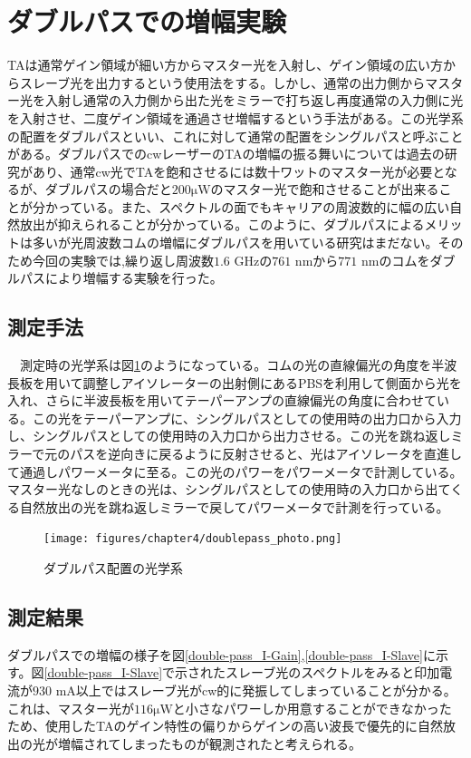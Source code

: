 \documentclass[uplatex, dvipdfmx, a4paper, report, papersize, 11pt]{jsbook}
\begin{document}
\section{ダブルパスでの増幅実験}

TAは通常ゲイン領域が細い方からマスター光を入射し、ゲイン領域の広い方からスレーブ光を出力するという使用法をする。しかし、通常の出力側からマスター光を入射し通常の入力側から出た光をミラーで打ち返し再度通常の入力側に光を入射させ、二度ゲイン領域を通過させ増幅するという手法がある。この光学系の配置をダブルパスといい、これに対して通常の配置をシングルパスと呼ぶことがある。ダブルパスでのcwレーザーのTAの増幅の振る舞いについては過去の研究\cite{doi:10.1063/1.3501966}があり、通常cw光でTAを飽和させるには数十ワットのマスター光が必要となるが、ダブルパスの場合だと$200 \mathrm{\mu W}$のマスター光で飽和させることが出来ることが分かっている。また、スペクトルの面でもキャリアの周波数的に幅の広い自然放出が抑えられることが分かっている。このように、ダブルパスによるメリットは多いが光周波数コムの増幅にダブルパスを用いている研究はまだない。そのため今回の実験では,繰り返し周波数$1.6$ GHzの$761$ nmから$771$ nmのコムをダブルパスにより増幅する実験を行った。


\subsection{測定手法}
　測定時の光学系は図\ref{doublepass_photo}のようになっている。コムの光の直線偏光の角度を半波長板を用いて調整しアイソレーターの出射側にあるPBSを利用して側面から光を入れ、さらに半波長板を用いてテーパーアンプの直線偏光の角度に合わせている。この光をテーパーアンプに、シングルパスとしての使用時の出力口から入力し、シングルパスとしての使用時の入力口から出力させる。この光を跳ね返しミラーで元のパスを逆向きに戻るように反射させると、光はアイソレータを直進して通過しパワーメータに至る。この光のパワーをパワーメータで計測している。マスター光なしのときの光は、シングルパスとしての使用時の入力口から出てくる自然放出の光を跳ね返しミラーで戻してパワーメータで計測を行っている。
\begin{figure}[H]
 \begin{center}
  \texttt{[image: figures/chapter4/doublepass\_photo.png]}
\end{center}
 \caption{ダブルパス配置の光学系}
 \label{doublepass_photo}
\end{figure}

\subsection{測定結果}
ダブルパスでの増幅の様子を図\ref{double-pass_I-Gain},\ref{double-pass_I-Slave}に示す。図\ref{double-pass_I-Slave}で示されたスレーブ光のスペクトルをみると印加電流が$930$ mA以上ではスレーブ光がcw的に発振してしまっていることが分かる。これは、マスター光が$116 \mathrm{\mu W}$と小さなパワーしか用意することができなかったため、使用したTAのゲイン特性の偏りからゲインの高い波長で優先的に自然放出の光が増幅されてしまったものが観測されたと考えられる。
\end{document}
